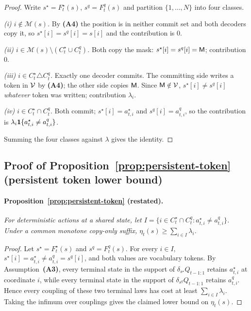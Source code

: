 \begin{proof}
Write $s^{\star}=F^{\star}_{t}(s)$, $s^{q}=F^{q}_{t}(s)$ and partition $\{1,\dots,N\}$ into four
classes.

\emph{(i) $i\notin\mathcal{M}(s)$.} By \textbf{(A4)} the position is in neither commit set and both decoders copy it, so $s^{\star}[i]=s^{q}[i]=s[i]$ and the contribution is $0$.

\emph{(ii) $i\in\mathcal{M}(s)\setminus(C^{\star}_{t}\cup C^{q}_{t})$.} Both copy the mask:
$s^{\star}[i]=s^{q}[i]=\mathsf{M}$; contribution $0$.

\emph{(iii) $i\in C^{\star}_{t}\triangle C^{q}_{t}$.} Exactly one decoder commits. The committing
side writes a token in $\mathcal{V}$ by \textbf{(A4)}; the other side copies $\mathsf{M}$. Since
$\mathsf{M}\notin\mathcal{V}$, $s^{\star}[i]\neq s^{q}[i]$ \emph{whatever} token was written; contribution
$\lambda_{i}$.

\emph{(iv) $i\in C^{\star}_{t}\cap C^{q}_{t}$.} Both commit; $s^{\star}[i]=a^{\star}_{t,i}$ and
$s^{q}[i]=a^{q}_{t,i}$, so the contribution is $\lambda_{i}\mathbf{1}\{a^{\star}_{t,i}\neq a^{q}_{t,i}\}$.

Summing the four classes against $\lambda$ gives the identity.
\end{proof}

\subsection{Proof of Proposition~\ref{prop:persistent-token} (persistent token lower bound)}
\label{app:proofs:persistence}

\paragraph{Proposition~\ref{prop:persistent-token} (restated).}
\emph{For deterministic actions at a shared state, let
$I=\{i\in C_t^\star\cap C_t^q:a_{t,i}^\star\ne a_{t,i}^q\}$. Under a common monotone copy-only
suffix, $\eta_t(s)\ge\sum_{i\in I}\lambda_i$.}

\begin{proof}
Let $s^\star=F_t^\star(s)$ and $s^q=F_t^q(s)$. For every $i\in I$,
$s^\star[i]=a_{t,i}^\star\ne a_{t,i}^q=s^q[i]$, and both values are vocabulary tokens. By
Assumption~\textbf{(A3)}, every terminal state in the support of
$\delta_{s^\star}Q_{t-1:1}$ retains $a_{t,i}^\star$ at coordinate $i$, while every terminal state
in the support of $\delta_{s^q}Q_{t-1:1}$ retains $a_{t,i}^q$. Hence every coupling of these two
terminal laws has cost at least $\sum_{i\in I}\lambda_i$. Taking the infimum over couplings gives
the claimed lower bound on $\eta_t(s)$.
\end{proof}

